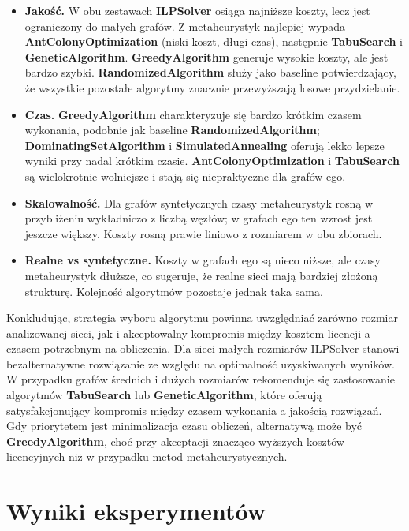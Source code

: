 \begin{itemize}
\item \textbf{Jakość.} W obu zestawach \textbf{ILPSolver} osiąga najniższe koszty, lecz jest ograniczony do małych grafów. Z metaheurystyk najlepiej wypada \textbf{AntColonyOptimization} (niski koszt, długi czas), następnie \textbf{TabuSearch} i \textbf{GeneticAlgorithm}. \textbf{GreedyAlgorithm} generuje wysokie koszty, ale jest bardzo szybki. \textbf{RandomizedAlgorithm} służy jako baseline potwierdzający, że wszystkie pozostałe algorytmy znacznie przewyższają losowe przydzielanie.

\item \textbf{Czas.} \textbf{GreedyAlgorithm} charakteryzuje się bardzo krótkim czasem wykonania, podobnie jak baseline \textbf{RandomizedAlgorithm}; \textbf{DominatingSetAlgorithm} i \textbf{SimulatedAnnealing} oferują lekko lepsze wyniki przy nadal krótkim czasie. \textbf{AntColonyOptimization} i \textbf{TabuSearch} są wielokrotnie wolniejsze i stają się niepraktyczne dla grafów ego.

\item \textbf{Skalowalność.} Dla grafów syntetycznych czasy metaheurystyk rosną w przybliżeniu wykładniczo z liczbą węzłów; w grafach ego ten wzrost jest jeszcze większy. Koszty rosną prawie liniowo z rozmiarem w obu zbiorach.

\item \textbf{Realne vs syntetyczne.} Koszty w grafach ego są nieco niższe, ale czasy metaheurystyk dłuższe, co sugeruje, że realne sieci mają bardziej złożoną strukturę. Kolejność algorytmów pozostaje jednak taka sama.
\end{itemize}

Konkludując, strategia wyboru algorytmu powinna uwzględniać zarówno rozmiar analizowanej sieci, jak i akceptowalny kompromis między kosztem licencji a czasem potrzebnym na obliczenia. Dla sieci małych rozmiarów ILPSolver stanowi bezalternatywne rozwiązanie ze względu na optimalność uzyskiwanych wyników. W przypadku grafów średnich i dużych rozmiarów rekomenduje się zastosowanie algorytmów \textbf{TabuSearch} lub \textbf{GeneticAlgorithm}, które oferują satysfakcjonujący kompromis między czasem wykonania a jakością rozwiązań. Gdy priorytetem jest minimalizacja czasu obliczeń, alternatywą może być \textbf{GreedyAlgorithm}, choć przy akceptacji znacząco wyższych kosztów licencyjnych niż w przypadku metod metaheurystycznych.



\section{Wyniki eksperymentów}

